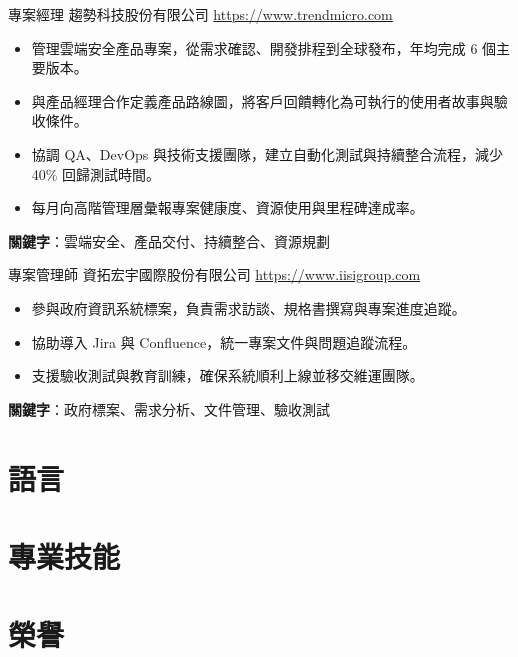 \documentclass[a4paper, serif, 10pt]{moderncv}
\begin{document}
        {專案經理}
        {趨勢科技股份有限公司}
        {\url{https://www.trendmicro.com}}
        {}
        {\begin{itemize}
\item 管理雲端安全產品專案，從需求確認、開發排程到全球發布，年均完成 6 個主要版本。
\item 與產品經理合作定義產品路線圖，將客戶回饋轉化為可執行的使用者故事與驗收條件。
\item 協調 QA、DevOps 與技術支援團隊，建立自動化測試與持續整合流程，減少 40\% 回歸測試時間。
\item 每月向高階管理層彙報專案健康度、資源使用與里程碑達成率。
\end{itemize}
\textbf{關鍵字}：雲端安全、產品交付、持續整合、資源規劃}

        {專案管理師}
        {資拓宏宇國際股份有限公司}
        {\url{https://www.iisigroup.com}}
        {}
        {\begin{itemize}
\item 參與政府資訊系統標案，負責需求訪談、規格書撰寫與專案進度追蹤。
\item 協助導入 Jira 與 Confluence，統一專案文件與問題追蹤流程。
\item 支援驗收測試與教育訓練，確保系統順利上線並移交維運團隊。
\end{itemize}
\textbf{關鍵字}：政府標案、需求分析、文件管理、驗收測試}
\section{語言}

\section{專業技能}

\section{榮譽}
\end{document}
